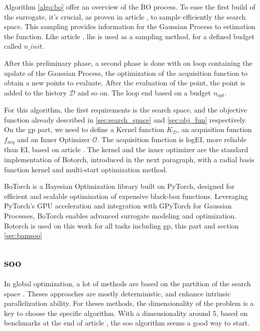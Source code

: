 Algorithm \ref{algo:bo} offer an overview of the BO process. To ease the first build of the surrogate, it's crucial, as proven in article \cite{wilson_efficiently_2020}, to sample efficiently the search space. This sampling provides information for the Gaussian Process to estimation the function. Like article \cite{borisut_adaptive_2023}, \acrfull{lhs} is used as a sampling method, for a defined budget called $n\_init$. 

After this preliminary phase, a second phase is done with on loop containing the update of the Gaussian Process, the optimization of the acquisition function to obtain a new points to evaluate. After the evaluation of the point, the point is added to the history $\mathcal D$ and so on. The loop end based on a budget $n_{opt}$. 

For this algorithm, the first requirements is the search space, and the objective function already described in \ref{sec:search_space} and \ref{sec:obj_fun} respectively. On the \acrshort{gp} part, we need to define a Kernel function $K_\mathcal D$, an acquisition function $f_{acq}$ and an Inner Optimizer $\mathcal O$. The acquisition function is logEI, more reliable than EI, based on article \cite{ament_unexpected_2024}. The kernel and the inner optimizer are the standard implementation of Botorch, introduced in the next paragraph, with a radial basis function kernel and multi-start optimization method. 

BoTorch \cite{balandat_botorch_2020} is a Bayesian Optimization library built on PyTorch, designed for efficient and scalable optimization of expensive black-box functions. Leveraging PyTorch's GPU acceleration and integration with GPyTorch \cite{gardner_gpytorch_2021} for Gaussian Processes, BoTorch enables advanced surrogate modeling and optimization. Botorch is used on this work for all tasks including \acrshort{gp}, this part and section \ref{sec:bamsoo}

\subsection{\acrfull{soo}}
\label{sec:soo}

In global optimization, a lot of methods are based on the partition of the search space \cite{nakib_deterministic_2017,jones_lipschitzian_1993,munos_optimistic_2011}. Theses approaches are mostly deterministic, and enhance intrinsic parallelization ability. For theses methods, the dimensionality of the problem is a key to choose the specific algorithm. With a dimensionality around 5, based on benchmarks at the end of article \cite{firmin_fractal-based_2022}, the \acrfull{soo} \cite{munos_optimistic_2011} algorithm seems a good way to start. 

